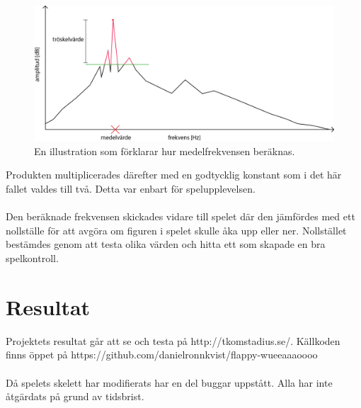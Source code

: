 \documentclass[12pt, titlepage, a4paper]{article}
\begin{document}
      		\renewcommand*\figurename{Bild}
				\begin{figure}[h!]
					\centering
						\includegraphics[width=1\textwidth]{explanation.png}
  							\caption{En illustration som förklarar hur medelfrekvensen beräknas.}
				\end{figure}
			Produkten multiplicerades därefter med en godtycklig konstant som i det här fallet valdes till två. Detta var enbart för spelupplevelsen.
			\\ \\
			Den beräknade frekvensen skickades vidare till spelet där den jämfördes med ett nollställe för att avgöra om figuren i spelet skulle åka upp eller ner. Nollstället bestämdes genom att testa olika värden och hitta ett som skapade en bra spelkontroll.

	\section{Resultat}

		Projektets resultat går att se och testa på http://tkomstadius.se/. Källkoden finns öppet på  https://github.com/danielronnkvist/flappy-wueeaaaoooo
		\\ \\
		Då spelets skelett har modifierats har en del buggar uppstått. Alla har inte åtgärdats på grund av tidsbrist.
\end{document}
